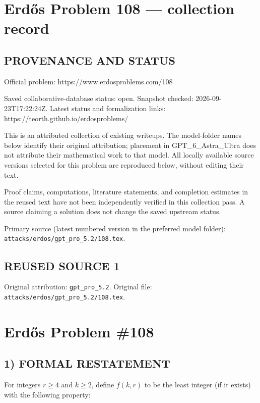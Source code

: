 \section*{Erd\H{o}s Problem 108 --- collection record}

\subsection*{PROVENANCE AND STATUS}
Official problem: https://www.erdosproblems.com/108

Saved collaborative-database status: open.
Snapshot checked: 2026-09-23T17:22:24Z.
Latest status and formalization links: https://teorth.github.io/erdosproblems/

This is an attributed collection of existing writeups. The model-folder names below identify their original attribution; placement in GPT\_6\_Astra\_Ultra does not attribute their mathematical work to that model. All locally available source versions selected for this problem are reproduced below, without editing their text.

Proof claims, computations, literature statements, and completion estimates in the reused text have not been independently verified in this collection pass. A source claiming a solution does not change the saved upstream status.

Primary source (latest numbered version in the preferred model folder): \texttt{attacks/erdos/gpt\_pro\_5.2/108.tex}.

\subsection*{REUSED SOURCE 1}
Original attribution: \texttt{gpt\_pro\_5.2}.
Original file: \texttt{attacks/erdos/gpt\_pro\_5.2/108.tex}.


\section*{Erd\H{o}s Problem \#108}

\subsection*{1) FORMAL RESTATEMENT}
For integers $r\ge4$ and $k\ge2$, define $f(k,r)$ to be the least integer (if it exists) with the following property:

